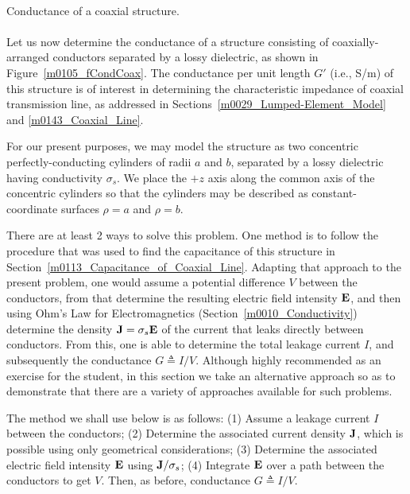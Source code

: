~\\ \begin{example} 
\begin{mdframed}[backgroundcolor=brown!20,linecolor=brown!20]\raggedright
Conductance of a coaxial structure.
\\~\\
Let us now determine the conductance of a structure consisting of coaxially-arranged conductors separated by a lossy dielectric, as shown in Figure~\ref{m0105_fCondCoax}.
The conductance per unit length $G'$ (i.e., S/m) of this structure is of interest in determining the characteristic impedance of coaxial transmission line, as addressed in Sections~\ref{m0029_Lumped-Element_Model} and \ref{m0143_Coaxial_Line}.

For our present purposes, we may model the structure as two concentric perfectly-conducting cylinders of radii $a$ and $b$, separated by a lossy dielectric having conductivity $\sigma_s$.
We place the $+z$ axis along the common axis of the concentric cylinders so that the cylinders may be described as constant-coordinate surfaces $\rho=a$ and $\rho=b$.

There are at least 2 ways to solve this problem.
One method is to follow the procedure that was used to find the capacitance of this structure in Section~\ref{m0113_Capacitance_of_Coaxial_Line}.
Adapting that approach to the present problem, one would assume a potential difference $V$ between the conductors, from that determine the resulting electric field intensity ${\bf E}$, and then using Ohm's Law for Electromagnetics (Section~\ref{m0010_Conductivity}) determine the density ${\bf J}=\sigma_s {\bf E}$ of the current that leaks directly between conductors. From this, one is able to determine the total leakage current $I$, and subsequently the conductance $G\triangleq I/V$.  
Although highly recommended as an exercise for the student, in this section we take an alternative approach so as to demonstrate that there are a variety of approaches available for such problems.

The method we shall use below is as follows:
(1) Assume a leakage current $I$ between the conductors; 
(2) Determine the associated current density ${\bf J}$, which is possible using only geometrical considerations; 
(3) Determine the associated electric field intensity ${\bf E}$ using ${\bf J}/\sigma_s$;
(4) Integrate ${\bf E}$ over a path between the conductors to get $V$.
Then, as before, conductance $G\triangleq I/V$.


\end{mdframed}
\end{example}
